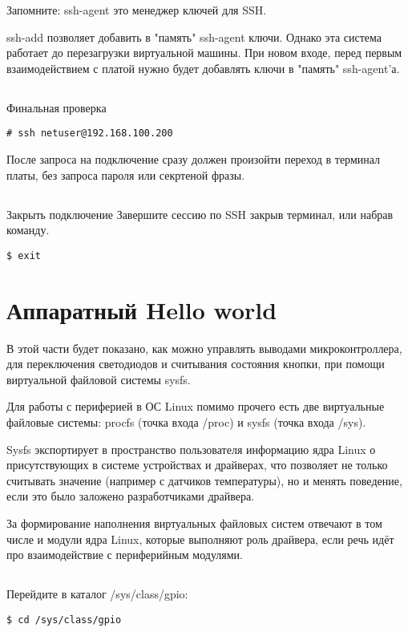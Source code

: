 \begin{Notes}{Запомните:}
ssh-agent это менеджер ключей для SSH. 

ssh-add позволяет добавить в "память" ssh-agent ключи. Однако эта система работает до перезагрузки виртуальной машины. При новом входе, перед первым взаимодействием с платой нужно будет добавлять ключи в "память" ssh-agent'а.
\end{Notes}

\subsection{}Финальная проверка
\begin{lstlisting}[style=bash]
# ssh netuser@192.168.100.200
\end{lstlisting}
После запроса на подключение сразу должен произойти переход в терминал платы, без запроса пароля или секртеной фразы.

\subsection{}Закрыть подключение
Завершите сессию по SSH закрыв терминал, или набрав команду. 
\begin{lstlisting}[style=bash]
$ exit
\end{lstlisting}


\section{Аппаратный Hello world }

В этой части будет показано, как можно управлять выводами микроконтроллера, для переключения светодиодов и считывания состояния кнопки, при помощи виртуальной файловой системы sysfs.

Для работы с периферией в ОС Linux помимо прочего есть две виртуальные файловые системы: procfs (точка входа /proc) и sysfs (точка входа /sys).  

Sysfs экспортирует в пространство пользователя информацию ядра Linux о присутствующих в системе устройствах и драйверах, что позволяет не только считывать значение (например с датчиков температуры), но и менять поведение, если это было заложено разработчиками драйвера.

За формирование наполнения виртуальных файловых систем отвечают в том числе и модули ядра Linux, которые выполняют роль драйвера, если речь идёт про взаимодействие с периферийным модулями.

\subsection{}Перейдите в каталог /sys/class/gpio:
\begin{lstlisting}[style=bash]
$ cd /sys/class/gpio
\end{lstlisting}

